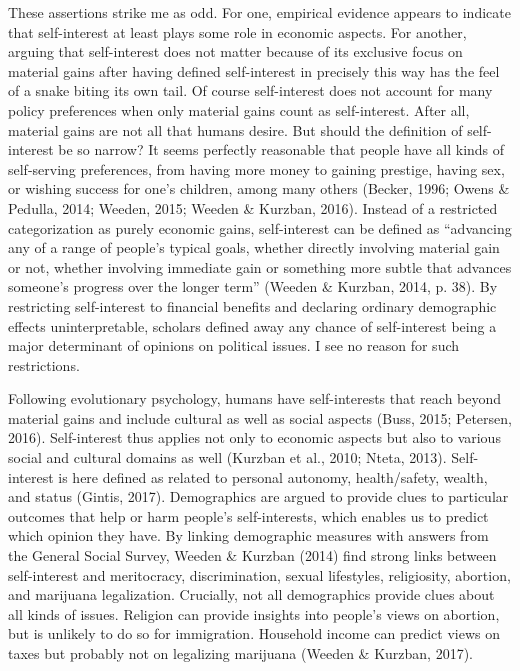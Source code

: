 \documentclass[12pt,econ]{sources/authesis}
\begin{document}
These assertions strike me as odd. For one, empirical evidence appears to indicate that self-interest at least plays some role in economic aspects. For another, arguing that self-interest does not matter because of its exclusive focus on material gains after having defined self-interest in precisely this way has the feel of a snake biting its own tail. Of course self-interest does not account for many policy preferences when only material gains count as self-interest. After all, material gains are not all that humans desire. But should the definition of self-interest be so narrow? It seems perfectly reasonable that people have all kinds of self-serving preferences, from having more money to gaining prestige, having sex, or wishing success for one's children, among many others (Becker, 1996; Owens \& Pedulla, 2014; Weeden, 2015; Weeden \& Kurzban, 2016). Instead of a restricted categorization as purely economic gains, self-interest can be defined as ``advancing any of a range of people's typical goals, whether directly involving material gain or not, whether involving immediate gain or something more subtle that advances someone's progress over the longer term'' (Weeden \& Kurzban, 2014, p. 38). By restricting self-interest to financial benefits and declaring ordinary demographic effects uninterpretable, scholars defined away any chance of self-interest being a major determinant of opinions on political issues. I see no reason for such restrictions.

Following evolutionary psychology, humans have self-interests that reach beyond material gains and include cultural as well as social aspects (Buss, 2015; Petersen, 2016). Self-interest thus applies not only to economic aspects but also to various social and cultural domains as well (Kurzban et al., 2010; Nteta, 2013). Self-interest is here defined as related to personal autonomy, health/safety, wealth, and status (Gintis, 2017). Demographics are argued to provide clues to particular outcomes that help or harm people's self-interests, which enables us to predict which opinion they have. By linking demographic measures with answers from the General Social Survey, Weeden \& Kurzban (2014) find strong links between self-interest and meritocracy, discrimination, sexual lifestyles, religiosity, abortion, and marijuana legalization. Crucially, not all demographics provide clues about all kinds of issues. Religion can provide insights into people's views on abortion, but is unlikely to do so for immigration. Household income can predict views on taxes but probably not on legalizing marijuana (Weeden \& Kurzban, 2017).
\end{document}
